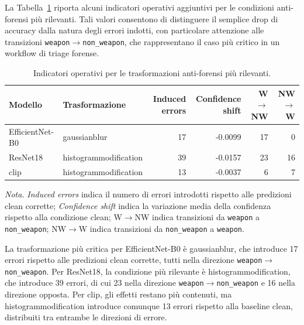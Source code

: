 La Tabella~\ref{tab:results-antiforensic-operational-errors} riporta alcuni
indicatori operativi aggiuntivi per le condizioni anti-forensi più rilevanti.
Tali valori consentono di distinguere il semplice drop di accuracy dalla natura
degli errori indotti, con particolare attenzione alle transizioni
\texttt{weapon}\(\rightarrow\)\texttt{non\_weapon}, che rappresentano il caso più
critico in un workflow di triage forense.

\begin{table}[H]
\centering
\scriptsize
\setlength{\tabcolsep}{4pt}
\renewcommand{\arraystretch}{1.15}
\caption{Indicatori operativi per le trasformazioni anti-forensi più rilevanti.}
\label{tab:results-antiforensic-operational-errors}
\begin{tabular}{@{}l l r r r r@{}}
\toprule
\textbf{Modello} &
\textbf{Trasformazione} &
\textbf{Induced errors} &
\textbf{Confidence shift} &
\textbf{W\(\rightarrow\)NW} &
\textbf{NW\(\rightarrow\)W} \\
\midrule
EfficientNet-B0 & \gls{gaussianblur} & 17 & -0.0099 & 17 & 0 \\
ResNet18 & \gls{histogrammodification} & 39 & -0.0157 & 23 & 16 \\
\acrshort{clip} & \gls{histogrammodification} & 13 & -0.0037 & 6 & 7 \\
\bottomrule
\end{tabular}

\vspace{0.4em}
\footnotesize
\textit{Nota.} \textit{Induced errors} indica il numero di errori introdotti
rispetto alle predizioni clean corrette; \textit{Confidence shift} indica la
variazione media della confidenza rispetto alla condizione clean;
W\(\rightarrow\)NW indica transizioni da \texttt{weapon} a
\texttt{non\_weapon}; NW\(\rightarrow\)W indica transizioni da
\texttt{non\_weapon} a \texttt{weapon}.
\end{table}

La trasformazione più critica per EfficientNet-B0 è \gls{gaussianblur}, che
introduce 17 errori rispetto alle predizioni clean corrette, tutti nella direzione
\texttt{weapon}\(\rightarrow\)\texttt{non\_weapon}. Per ResNet18, la condizione
più rilevante è \gls{histogrammodification}, che introduce 39 errori, di cui 23
nella direzione \texttt{weapon}\(\rightarrow\)\texttt{non\_weapon} e 16 nella
direzione opposta. Per \gls{clip}, gli effetti restano più contenuti, ma
\gls{histogrammodification} introduce comunque 13 errori rispetto alla baseline
clean, distribuiti tra entrambe le direzioni di errore.

